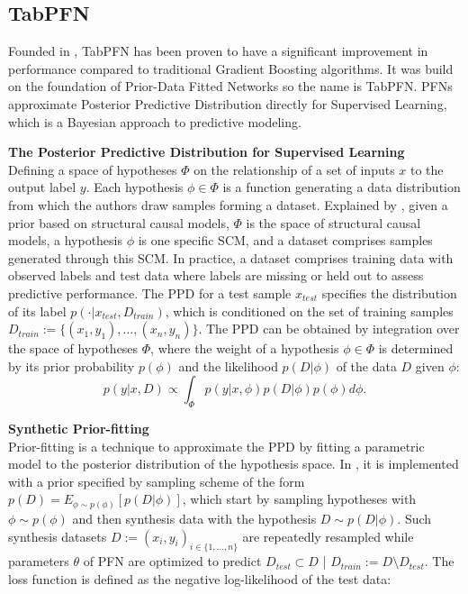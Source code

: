 \documentclass[../main.tex]{subfiles}
\begin{document}
\subsection{TabPFN}

Founded in , TabPFN has been proven to have a significant improvement in performance compared to traditional Gradient Boosting algorithms.
It was build on the foundation of Prior-Data Fitted Networks so the name is TabPFN.
PFNs approximate Posterior Predictive Distribution directly for Supervised Learning, which is a Bayesian approach to predictive modeling.

\textbf{The Posterior Predictive Distribution for Supervised Learning} \\
Defining a space of hypotheses $\Phi$ on the relationship of a set of inputs $x$ to the output label $y$.
Each hypothesis $\phi \in \Phi$ is a function generating a data distribution from which the authors draw samples forming a dataset.
Explained by \citeauthor{tabpfn}, given a prior based on structural causal models, $\Phi$ is the space of structural causal models, a hypothesis $\phi$ is one specific SCM, and a dataset comprises samples generated through this SCM.
In practice, a dataset comprises training data with observed labels and test data where labels are missing or held out to assess predictive performance.
The \gls{PPD} for a test sample $x_{test}$ specifies the distribution of its label $p(\cdot|x_{test},D_{train})$, which is conditioned on the set of training samples $D_{train} := \{(x_1,y_1), \dots, (x_n,y_n)\}$.
The \gls{PPD} can be obtained by integration over the space of hypotheses $\Phi$, where the weight of a hypothesis $\phi\in\Phi$ is determined by its prior probability $p(\phi)$ and the likelihood $p(D|\phi)$ of the data $D$ given $\phi$:
\begin{equation}
    p(y|x,D) \propto \int_{\Phi} p(y|x,\phi) p(D|\phi) p(\phi) d\phi.
    \label{eq:ppd}
\end{equation}


\textbf{Synthetic Prior-fitting}\\
Prior-fitting is a technique to approximate the \gls{PPD} by fitting a parametric model to the posterior distribution of the hypothesis space.
In , it is implemented with a prior specified by sampling scheme of the form $p(D)=E_{\phi \sim p(\phi)}[p(D|\phi)]$, which start by sampling hypotheses with $\phi \sim p(\phi)$ and then synthesis data with the hypothesis $D \sim p(D|\phi)$.
Such synthesis datasets $D := (x_i, y_i)_{i \in \{1, \dots, n\}}$ are repeatedly resampled while parameters $\theta$ of \gls{PFN} are optimized to predict $D_{test} \subset D$ | $D_{train} := D \setminus D_{test}$.
The loss function is defined as the negative log-likelihood of the test data:
\end{document}
